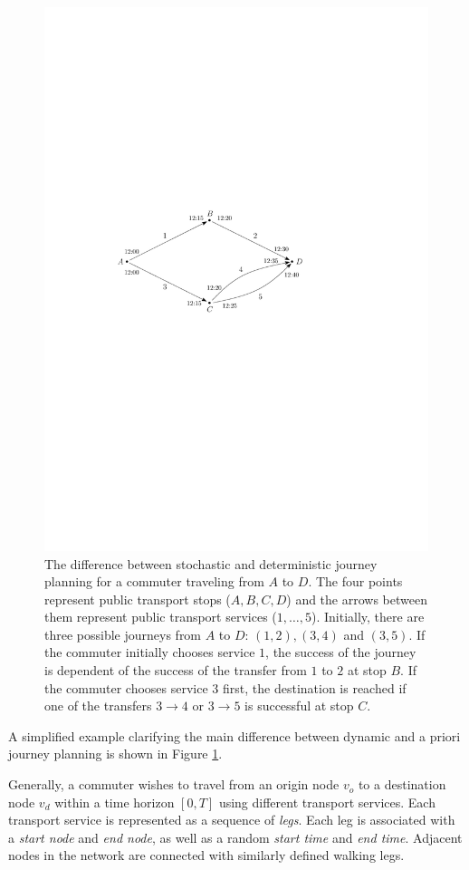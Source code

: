 \documentclass[dissertation,draft*]{aaltoseries}
\begin{document}
\begin{figure}[ht]
\begin{center}
\includegraphics[width=0.7\columnwidth]{stokvsdet01}
\end{center}
\caption{The difference between stochastic and deterministic journey planning for a commuter 
traveling from $A$ to $D$. The four points represent public transport stops ($A,B,C,D$) and 
the arrows between them represent public transport services ($1,\ldots,5$).
Initially, there are three possible journeys from $A$ to $D$: $(1,2),(3,4)$ and $(3,5)$.
If the commuter initially chooses service $1$, the success of the journey is 
dependent of the success of the transfer from $1$ to $2$ at stop $B$. If the commuter chooses
service $3$ first, the destination is reached if one of the transfers $3 \to 4$ or $3 \to 5$
is successful at stop $C$.
}
\label{stokvsdet01}
\end{figure}

A simplified example clarifying the main difference between dynamic and a priori journey planning is 
shown in Figure \ref{stokvsdet01}. 

Generally, a commuter wishes to travel from an origin node $v_o$ 
to a destination node $v_d$ within a time horizon $[0,T]$ using different transport services.
Each transport service is represented as a sequence of \emph{legs}. Each leg is associated
with a \emph{start node} and \emph{end node}, as well as a random \emph{start time} and \emph{end time}.
Adjacent nodes in the network are connected with similarly defined walking legs. %
\end{document}
